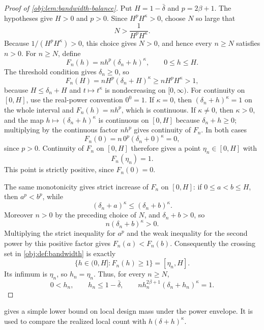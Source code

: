 \documentclass[11pt]{article}
\begin{document}
\begin{proof}[Proof of \cref{obj:lem:bandwidth-balance}]
Put \(H=1-\bar\delta\) and \(p=2\beta+1\).  The hypotheses give \(H>0\) and \(p>0\).  Since \(H^pH^\kappa>0\), choose \(N\) so large that
\[
        N>\frac{1}{H^pH^\kappa}.
\]
Because \(1/(H^pH^\kappa)>0\), this choice gives \(N>0\), and hence every \(n\ge N\) satisfies \(n>0\).  For \(n\ge N\), define
\[
        F_n(h)=n h^p(\delta_n+h)^\kappa,\qquad 0\le h\le H .
\]
The threshold condition gives \(\delta_n\ge0\), so
\[
        F_n(H)
        = nH^p(\delta_n+H)^\kappa
        \ge nH^pH^\kappa
        >1,
\]
because \(H\le \delta_n+H\) and \(t\mapsto t^\kappa\) is nondecreasing on \([0,\infty)\).  For continuity on \([0,H]\), use the real-power convention \(0^0=1\).  If \(\kappa=0\), then \((\delta_n+h)^\kappa=1\) on the whole interval and \(F_n(h)=n h^p\), which is continuous.  If \(\kappa\ne0\), then \(\kappa>0\), and the map \(h\mapsto(\delta_n+h)^\kappa\) is continuous on \([0,H]\) because \(\delta_n+h\ge0\); multiplying by the continuous factor \(n h^p\) gives continuity of \(F_n\).  In both cases
\[
        F_n(0)=n\,0^p(\delta_n+0)^\kappa=0,
\]
since \(p>0\).  Continuity of \(F_n\) on \([0,H]\) therefore gives a point \(\eta_n\in[0,H]\) with
\[
        F_n(\eta_n)=1.
\]
This point is strictly positive, since \(F_n(0)=0\). %

The same monotonicity gives strict increase of \(F_n\) on \([0,H]\): if \(0\le a<b\le H\), then \(a^p<b^p\), while
\[
        (\delta_n+a)^\kappa\le(\delta_n+b)^\kappa .
\]
Moreover \(n>0\) by the preceding choice of \(N\), and \(\delta_n+b>0\), so
\[
        n(\delta_n+b)^\kappa>0 .
\]
Multiplying the strict inequality for \(a^p\) and the weak inequality for the second power by this positive factor gives \(F_n(a)<F_n(b)\).  Consequently the crossing set in \cref{obj:def:bandwidth} is exactly
\[
        \{h\in(0,H]:F_n(h)\ge1\}=[\eta_n,H].
\]
Its infimum is \(\eta_n\), so \(h_n=\eta_n\).  Thus, for every \(n\ge N\),
\[
        0<h_n,\qquad h_n\le 1-\bar\delta,\qquad
        n h_n^{2\beta+1}(\delta_n+h_n)^\kappa=1 .
\]
\end{proof}

 gives a simple lower bound on local design mass under the power envelope. It is used to compare the realized local count with \(h(\delta+h)^\kappa\).
\end{document}
